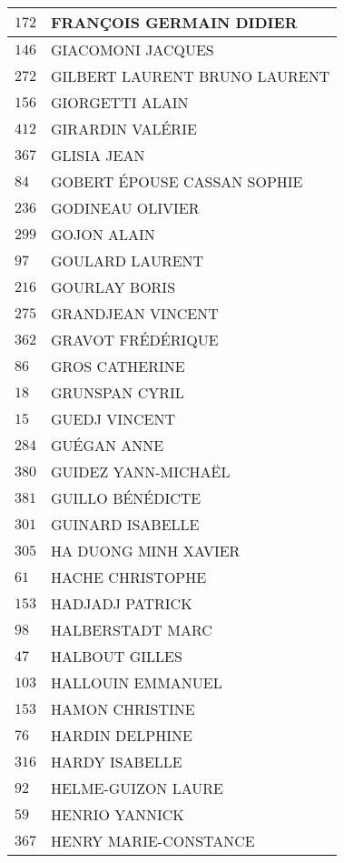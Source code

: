 \begin{xltabular}{\linewidth}{|l|X|}
    \hline
    $172$ & FRANÇOIS GERMAIN DIDIER \\
    \hline
    $146$ & GIACOMONI JACQUES \\
    \hline
    $272$ & GILBERT LAURENT BRUNO LAURENT \\
    \hline
    $156$ & GIORGETTI ALAIN \\
    \hline
    $412$ & GIRARDIN VALÉRIE \\
    \hline
    $367$ & GLISIA JEAN \\
    \hline
    $84$ & GOBERT ÉPOUSE CASSAN SOPHIE \\
    \hline
    $236$ & GODINEAU OLIVIER \\
    \hline
    $299$ & GOJON ALAIN \\
    \hline
    $97$ & GOULARD LAURENT \\
    \hline
    $216$ & GOURLAY BORIS \\
    \hline
    $275$ & GRANDJEAN VINCENT \\
    \hline
    $362$ & GRAVOT FRÉDÉRIQUE \\
    \hline
    $86$ & GROS CATHERINE \\
    \hline
    $18$ & GRUNSPAN CYRIL \\
    \hline
    $15$ & GUEDJ VINCENT \\
    \hline
    $284$ & GUÉGAN ANNE \\
    \hline
    $380$ & GUIDEZ YANN-MICHAËL \\
    \hline
    $381$ & GUILLO BÉNÉDICTE \\
    \hline
    $301$ & GUINARD ISABELLE \\
    \hline
    $305$ & HA DUONG MINH XAVIER \\
    \hline
    $61$ & HACHE CHRISTOPHE \\
    \hline
    $153$ & HADJADJ PATRICK \\
    \hline
    $98$ & HALBERSTADT MARC \\
    \hline
    $47$ & HALBOUT GILLES \\
    \hline
    $103$ & HALLOUIN EMMANUEL \\
    \hline
    $153$ & HAMON CHRISTINE \\
    \hline
    $76$ & HARDIN DELPHINE \\
    \hline
    $316$ & HARDY ISABELLE \\
    \hline
    $92$ & HELME-GUIZON LAURE \\
    \hline
    $59$ & HENRIO YANNICK \\
    \hline
    $367$ & HENRY MARIE-CONSTANCE \\

\end{xltabular}
